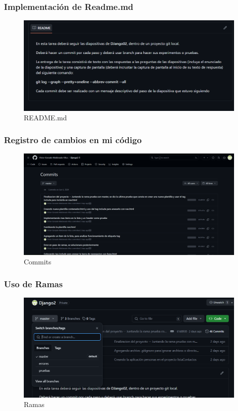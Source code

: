 \documentclass{article}
\begin{document}
  \subsubsection{Implementación de Readme.md}
  \begin{figure}[H]
    \centering
    \includegraphics[width=1\textwidth, keepaspectratio]{img/readme.png}
    \caption{README.md}
  \end{figure}
  

	\subsubsection{Registro de cambios en mi código}
  \begin{figure}[H]
    \centering
    \includegraphics[width=1\textwidth, keepaspectratio]{img/commit.png}
    \caption{Commits}
  \end{figure}
  

	\subsubsection{Uso de Ramas}
  \begin{figure}[H]
    \centering
    \includegraphics[width=1\textwidth, keepaspectratio]{img/ramas.png}
    \caption{Ramas}
  \end{figure}
	
\end{document}
